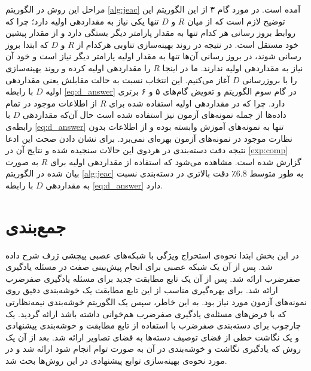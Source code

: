 مراحل این روش در الگوریتم \ref{alg:jeac} آمده است. در مورد گام ۳ از این الگوریتم این توضیح لازم است که از میان $R$ و $D$ تنها یکی نیاز به مقداردهی اولیه دارد؛ چرا که روابط بروز رسانی هر کدام تنها به مقدار پارامتر دیگر بستگی دارد و از مقدار پیشین خود مستقل است. در نتیجه در روند بهینه‌سازی تناوبی هرکدام از $R$ و $D$ که ابتدا بروز رسانی شوند، در بروز رسانی آن‌ها تنها به مقدار اولیه پارامتر دیگر نیاز است و خود آن نیاز به مقداردهی اولیه ندارند. ما در اینجا $R$ را مقداردهی اولیه کرده و روند بهینه‌سازی را با بروزرسانی $D$ آغاز می‌کنیم. این انتخاب نسبت به حالت مقابلش یعنی مقداردهی اولیه $D$ با رابطه
\eqref{eq:d_answer}
 در گام سوم الگوریتم و تعویض گام‌های ۵ و ۶ برتری دارد. چرا که در مقداردهی اولیه استفاده شده برای $R$ از اطلاعات موجود در تمام داده‌ها از جمله نمونه‌های آزمون نیز استفاده شده است حال آن‌که مقداردهی $D$ با رابطه‌ی \eqref{eq:d_answer} تنها به نمونه‌های آموزش وابسته بوده و از اطلاعات بدون نظارت موجود در نمونه‌های آزمون بهره‌ای نمی‌برد. برای نشان دادن صحت این ادعا نتیجه دقت دسته‌بندی در هردوی این حالات سنجیده شده و نتایج آن در  \ref{exp:comp} گزارش شده است. مشاهده می‌شود که استفاده از مقداردهی اولیه برای $R$ به صورت بیان شده در الگوریتم \ref{alg:jeac} به طور متوسط $6.8$٪ دقت بالاتری در دسته‌بندی نسبت به مقداردهی $D$  با رابطه \eqref{eq:d_answer} دارد.
\section{جمع‌بندی}
در این بخش ابتدا نحوه‌ی استخراج ویژگی با شبکه‌های عصبی پیچشی ژرف شرح داده شد. پس از آن یک شبکه عصبی برای انجام پیش‌بینی صفت در مسئله یادگیری صفرضرب ارائه شد. پس از آن یک تابع مطابقت جدید برای مسئله یادگیری صفرضرب ارائه شد. برای بهره‌گیری مناسب از این تابع مطابقت یک خوشه‌بندی دقیق روی نمونه‌های آزمون مورد نیاز بود. به این خاطر، سپس یک الگوریتم خوشه‌بندی نیمه‌نظارتی که با فرض‌های مسئله‌ی یادگیری صفرضرب هم‌خوانی داشته باشد ارائه گردید. یک چارچوب برای دسته‌بندی صفرضرب با استفاده از تابع مطابقت و خوشه‌بندی پیشنهادی و یک نگاشت خطی از فضای توصیف دسته‌ها به فضای تصاویر ارائه شد. بعد از آن یک روش که یادگیری نگاشت و خوشه‌بندی در آن  به صورت توام انجام شود ارائه شد و در مورد نحوه‌ی بهینه‌سازی توابع پیشنهادی در این روش‌ها بحث شد.
